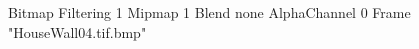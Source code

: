 {Bitmap
	{Filtering 1}
	{Mipmap 1}
	{Blend none}
	{AlphaChannel 0}
	{Frame "HouseWall04.tif.bmp"}
}
